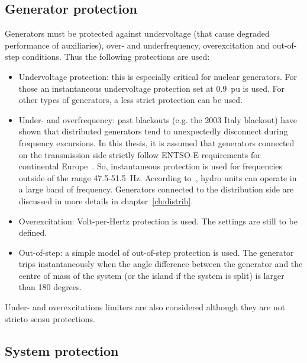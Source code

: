 \subsection{Generator protection}

Generators must be protected against undervoltage (that cause degraded performance of auxiliaries), over- and underfrequency, overexcitation and out-of-step conditions. Thus the following protections are used:

\begin{itemize}
    \item Undervoltage protection: this is especially critical for nuclear generators. For those an instantaneous undervoltage protection set at 0.9~pu is used. For other types of generators, a less strict protection can be used. 
    \item Under- and overfrequency: past blackouts (e.g. the 2003 Italy blackout) have shown that distributed generators tend to unexpectedly disconnect during frequency excursions. In this thesis, it is assumed that generators connected on the transmission side strictly follow ENTSO-E requirements for continental Europe~\cite{ENTSOEgeneratorRequirements}. So, instantaneous protection is used for frequencies outside of the range 47.5-51.5~Hz. According to~\cite{PSRCreportProtectionMisop}, hydro units can operate in a large band of frequency. Generators connected to the distribution side are discussed in more details in chapter~\ref{ch:distrib}.
    \item Overexcitation: Volt-per-Hertz protection is used. The settings are still to be defined.
    \item Out-of-step: a simple model of out-of-step protection is used. The generator trips instantaneously when the angle difference between the generator and the centre of mass of the system (or the island if the system is split) is larger than 180 degrees.
\end{itemize}

Under- and overexcitations limiters are also considered although they are not stricto sensu protections.


\subsection{System protection}

